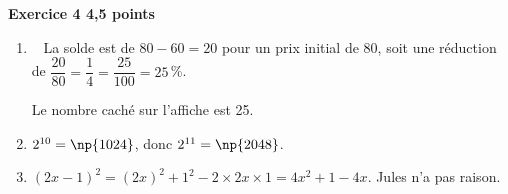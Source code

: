 \textbf{Exercice 4 \hfill 4,5 points}

\medskip

\begin{enumerate}
\item ~
La solde est de $80 - 60 = 20$ pour un prix initial de 80, soit une réduction de $\dfrac{20}{80} = \dfrac{1}{4} = \dfrac{25}{100} = 25$\,\%.

Le nombre caché sur l’affiche est 25.
%


\item  %
$2^{10} = \np{1024}$, donc $2^{11} = \np{2048}$.
\item  %
$(2x - 1)^2 = (2x)^2 + 1^2 - 2 \times 2x \times 1 = 4x^2 + 1 - 4x$. Jules n'a pas raison.
\end{enumerate}

\vspace{0,5cm}

